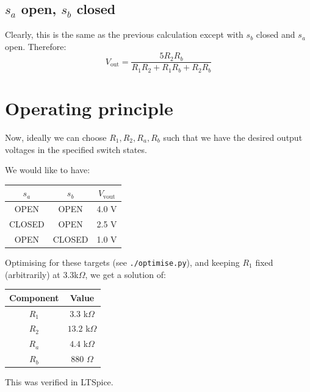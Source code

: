 \documentclass{article}
\begin{document}
\subsection{$s_a$ open, $s_b$ closed}
Clearly, this is the same as the previous calculation except with $s_b$ closed
and $s_a$ open. Therefore:
$$
V_\mathrm{out} = \frac{5R_2R_b}{R_1R_2 + R_1R_b + R_2R_b}
$$

\section{Operating principle}
Now, ideally we can choose $R_1,R_2,R_a,R_b$ such that we have the desired
output voltages in the specified switch states.

We would like to have:

\begin{center}
\begin{tabular}{cc|c}
    $s_a$ & $s_b$ & $V_\mathrm{vout}$ \\ \hline
    OPEN & OPEN & 4.0 V \\
    CLOSED & OPEN & 2.5 V \\
    OPEN & CLOSED & 1.0 V
\end{tabular}
\end{center}

Optimising for these targets (see \verb|./optimise.py|), and keeping $R_1$ fixed (arbitrarily) at 3.3k$\Omega$,
we get a solution of:
\begin{center}
\begin{tabular}{c|c}
    Component & Value \\ \hline
    $R_1$ & $3.3$ k$\Omega$ \\
    $R_2$ & $13.2$ k$\Omega$ \\
    $R_a$ & $4.4$ k$\Omega$ \\
    $R_b$ & $880$ $\Omega$
\end{tabular}
\end{center}

This was verified in LTSpice.
\end{document}
